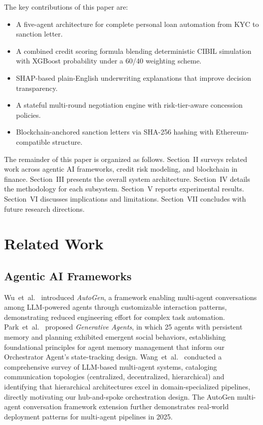 \documentclass[conference]{IEEEtran}
\begin{document}
The key contributions of this paper are:
\begin{itemize}
  \item A five-agent architecture for complete personal
        loan automation from KYC to sanction letter.
  \item A combined credit scoring formula blending
        deterministic CIBIL simulation with XGBoost
        probability under a 60/40 weighting scheme.
  \item SHAP-based plain-English underwriting explanations
        that improve decision transparency.
  \item A stateful multi-round negotiation engine with
        risk-tier-aware concession policies.
  \item Blockchain-anchored sanction letters via SHA-256
        hashing with Ethereum-compatible structure.
\end{itemize}

The remainder of this paper is organized as follows.
Section~II surveys related work across agentic AI
frameworks, credit risk modeling, and blockchain in
finance. Section~III presents the overall system
architecture. Section~IV details the methodology for
each subsystem. Section~V reports experimental results.
Section~VI discusses implications and limitations.
Section~VII concludes with future research directions.

\section{Related Work}

\subsection{Agentic AI Frameworks}

Wu~et~al.\ \cite{wu2023autogen} introduced \textit{AutoGen},
a framework enabling multi-agent conversations among
LLM-powered agents through customizable interaction
patterns, demonstrating reduced engineering effort for
complex task automation. Park~et~al.\ \cite{park2023generative}
proposed \textit{Generative Agents}, in which 25 agents
with persistent memory and planning exhibited emergent
social behaviors, establishing foundational principles
for agent memory management that inform our Orchestrator
Agent's state-tracking design. Wang~et~al.\
\cite{wang2024survey} conducted a comprehensive survey
of LLM-based multi-agent systems, cataloging
communication topologies (centralized, decentralized,
hierarchical) and identifying that hierarchical
architectures excel in domain-specialized pipelines,
directly motivating our hub-and-spoke orchestration
design. The AutoGen multi-agent conversation
framework extension \cite{autogen2025} further
demonstrates real-world deployment patterns for
multi-agent pipelines in 2025.
\end{document}
